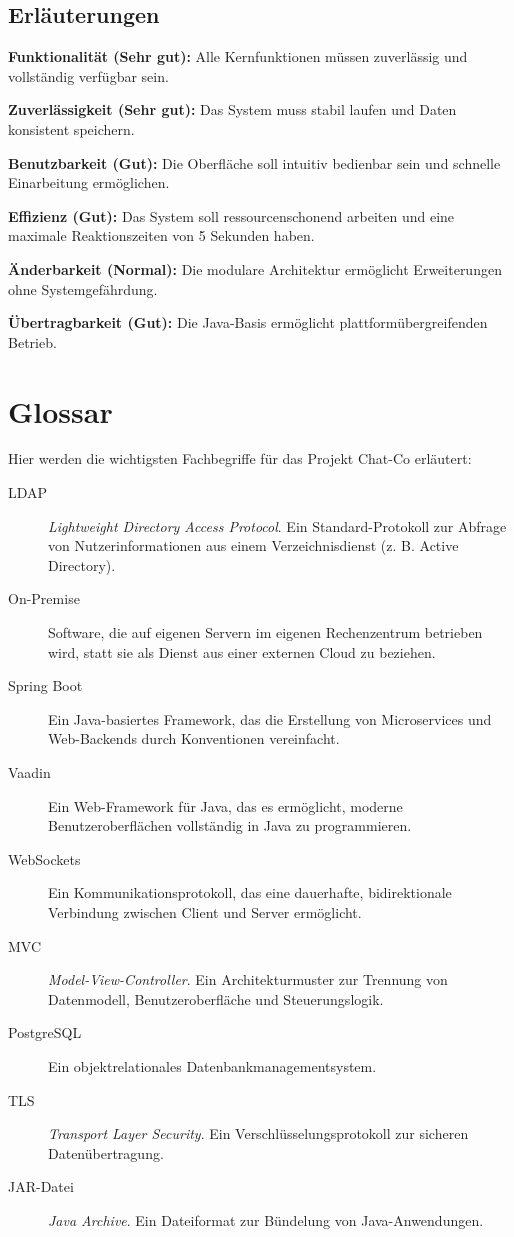 \documentclass[12pt,a4paper]{extarticle}
\begin{document}
\subsection*{Erläuterungen}

\textbf{Funktionalität (Sehr gut):}  
Alle Kernfunktionen müssen zuverlässig und vollständig verfügbar sein.

\textbf{Zuverlässigkeit (Sehr gut):}  
Das System muss stabil laufen und Daten konsistent speichern.

\textbf{Benutzbarkeit (Gut):}  
Die Oberfläche soll intuitiv bedienbar sein und schnelle Einarbeitung ermöglichen.

\textbf{Effizienz (Gut):}  
Das System soll ressourcenschonend arbeiten und eine maximale Reaktionszeiten von 5 Sekunden haben.

\textbf{Änderbarkeit (Normal):}  
Die modulare Architektur ermöglicht Erweiterungen ohne Systemgefährdung.

\textbf{Übertragbarkeit (Gut):}  
Die Java-Basis ermöglicht plattformübergreifenden Betrieb.


\newpage
\section{Glossar}

Hier werden die wichtigsten Fachbegriffe für das Projekt Chat-Co erläutert:

\begin{description}
\item[LDAP] \textit{Lightweight Directory Access Protocol}. Ein Standard-Protokoll zur Abfrage von Nutzerinformationen aus einem Verzeichnisdienst (z. B. Active Directory).
\item[On-Premise] Software, die auf eigenen Servern im eigenen Rechenzentrum betrieben wird, statt sie als Dienst aus einer externen Cloud zu beziehen.
\item[Spring Boot] Ein Java-basiertes Framework, das die Erstellung von Microservices und Web-Backends durch Konventionen vereinfacht.
\item[Vaadin] Ein Web-Framework für Java, das es ermöglicht, moderne Benutzeroberflächen vollständig in Java zu programmieren.
\item[WebSockets] Ein Kommunikationsprotokoll, das eine dauerhafte, bidirektionale Verbindung zwischen Client und Server ermöglicht.
\item[MVC] \textit{Model-View-Controller}. Ein Architekturmuster zur Trennung von Datenmodell, Benutzeroberfläche und Steuerungslogik.
\item[PostgreSQL] Ein objektrelationales Datenbankmanagementsystem.
\item[TLS] \textit{Transport Layer Security}. Ein Verschlüsselungsprotokoll zur sicheren Datenübertragung.
\item[JAR-Datei] \textit{Java Archive}. Ein Dateiformat zur Bündelung von Java-Anwendungen.
\end{description}
\end{document}
